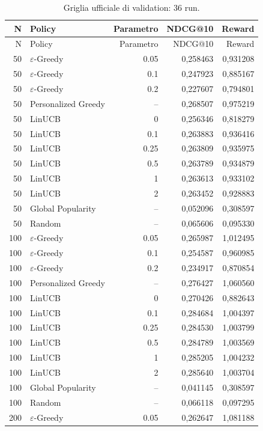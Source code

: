 \begin{longtable}{rlrrr}
\caption{Griglia ufficiale di validation: 36 run.}\\
\toprule N & Policy & Parametro & NDCG@10 & Reward \\
\midrule\endfirsthead
\toprule N & Policy & Parametro & NDCG@10 & Reward \\
\midrule\endhead
50 & $\varepsilon$-Greedy & 0.05 & 0,258463 & 0,931208 \\
50 & $\varepsilon$-Greedy & 0.1 & 0,247923 & 0,885167 \\
50 & $\varepsilon$-Greedy & 0.2 & 0,227607 & 0,794801 \\
50 & Personalized Greedy & -- & 0,268507 & 0,975219 \\
50 & LinUCB & 0 & 0,256346 & 0,818279 \\
50 & LinUCB & 0.1 & 0,263883 & 0,936416 \\
50 & LinUCB & 0.25 & 0,263809 & 0,935975 \\
50 & LinUCB & 0.5 & 0,263789 & 0,934879 \\
50 & LinUCB & 1 & 0,263613 & 0,933102 \\
50 & LinUCB & 2 & 0,263452 & 0,928883 \\
50 & Global Popularity & -- & 0,052096 & 0,308597 \\
50 & Random & -- & 0,065606 & 0,095330 \\
100 & $\varepsilon$-Greedy & 0.05 & 0,265987 & 1,012495 \\
100 & $\varepsilon$-Greedy & 0.1 & 0,254587 & 0,960985 \\
100 & $\varepsilon$-Greedy & 0.2 & 0,234917 & 0,870854 \\
100 & Personalized Greedy & -- & 0,276427 & 1,060560 \\
100 & LinUCB & 0 & 0,270426 & 0,882643 \\
100 & LinUCB & 0.1 & 0,284684 & 1,004397 \\
100 & LinUCB & 0.25 & 0,284530 & 1,003799 \\
100 & LinUCB & 0.5 & 0,284789 & 1,003569 \\
100 & LinUCB & 1 & 0,285205 & 1,004232 \\
100 & LinUCB & 2 & 0,285640 & 1,003704 \\
100 & Global Popularity & -- & 0,041145 & 0,308597 \\
100 & Random & -- & 0,066118 & 0,097295 \\
200 & $\varepsilon$-Greedy & 0.05 & 0,262647 & 1,081188 \\

\end{longtable}
